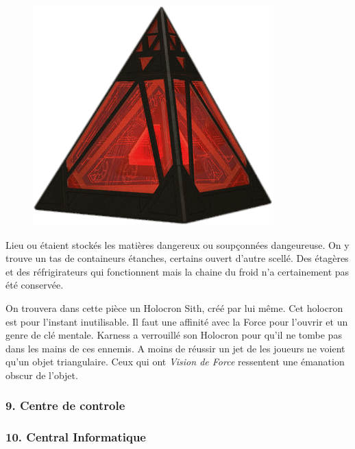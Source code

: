 \begin{figure}
    \vspace{-5\baselineskip}
    \centering\includegraphics[width=\linewidth]{_img/dos-au-muur/holocron-sith.png}
    \vspace{-2\baselineskip} 
\end{figure}
Lieu ou étaient stockés les matières dangereux ou soupçonnées dangeureuse. On y trouve un tas de containeurs étanches, certains ouvert d’autre scellé. Des étagères et des réfrigirateurs qui fonctionnent mais la chaine du froid n’a certainement pas été conservée.

On trouvera dans cette pièce un Holocron Sith, créé par  lui même. Cet holocron est pour l’instant inutilisable. Il faut une affinité avec la Force pour l’ouvrir et un genre de clé mentale. Karness a verrouillé son Holocron pour qu’il ne tombe pas dans les mains de ces ennemis. A moins de réussir un jet de  les joueurs ne voient qu’un objet triangulaire. Ceux qui ont \textit{Vision de Force} ressentent une émanation obscur de l’objet.

\subsubsection{9. Centre de controle}

\subsubsection{10. Central Informatique}

